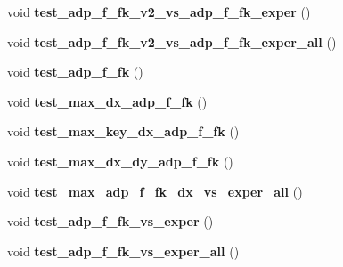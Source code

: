 \begin{DoxyCompactItemize}
\item 
\hypertarget{adp-tea-f-fk-tests_8cc_aab6bdf2062240f839eb3c81052d25497}{void {\bfseries test\-\_\-adp\-\_\-f\-\_\-fk\-\_\-v2\-\_\-vs\-\_\-adp\-\_\-f\-\_\-fk\-\_\-exper} ()}\label{adp-tea-f-fk-tests_8cc_aab6bdf2062240f839eb3c81052d25497}

\item 
\hypertarget{adp-tea-f-fk-tests_8cc_ad63023c04e2254011f35d82e3811b4bd}{void {\bfseries test\-\_\-adp\-\_\-f\-\_\-fk\-\_\-v2\-\_\-vs\-\_\-adp\-\_\-f\-\_\-fk\-\_\-exper\-\_\-all} ()}\label{adp-tea-f-fk-tests_8cc_ad63023c04e2254011f35d82e3811b4bd}

\item 
\hypertarget{adp-tea-f-fk-tests_8cc_a0a56b744da10d4186367990528e8bd7b}{void {\bfseries test\-\_\-adp\-\_\-f\-\_\-fk} ()}\label{adp-tea-f-fk-tests_8cc_a0a56b744da10d4186367990528e8bd7b}

\item 
\hypertarget{adp-tea-f-fk-tests_8cc_a2ba5832e577e649b1dab821477a4bc1f}{void {\bfseries test\-\_\-max\-\_\-dx\-\_\-adp\-\_\-f\-\_\-fk} ()}\label{adp-tea-f-fk-tests_8cc_a2ba5832e577e649b1dab821477a4bc1f}

\item 
\hypertarget{adp-tea-f-fk-tests_8cc_ade4ecb88cf875d7d6968a3871a861edb}{void {\bfseries test\-\_\-max\-\_\-key\-\_\-dx\-\_\-adp\-\_\-f\-\_\-fk} ()}\label{adp-tea-f-fk-tests_8cc_ade4ecb88cf875d7d6968a3871a861edb}

\item 
\hypertarget{adp-tea-f-fk-tests_8cc_a28e34b0b7bc6165d18984ee7a00ca9b4}{void {\bfseries test\-\_\-max\-\_\-dx\-\_\-dy\-\_\-adp\-\_\-f\-\_\-fk} ()}\label{adp-tea-f-fk-tests_8cc_a28e34b0b7bc6165d18984ee7a00ca9b4}

\item 
\hypertarget{adp-tea-f-fk-tests_8cc_af5f9c8e5e6ec0908de64c233f720ea61}{void {\bfseries test\-\_\-max\-\_\-adp\-\_\-f\-\_\-fk\-\_\-dx\-\_\-vs\-\_\-exper\-\_\-all} ()}\label{adp-tea-f-fk-tests_8cc_af5f9c8e5e6ec0908de64c233f720ea61}

\item 
\hypertarget{adp-tea-f-fk-tests_8cc_a94aa17e401cb93522e5c908e1d9d81d1}{void {\bfseries test\-\_\-adp\-\_\-f\-\_\-fk\-\_\-vs\-\_\-exper} ()}\label{adp-tea-f-fk-tests_8cc_a94aa17e401cb93522e5c908e1d9d81d1}

\item 
\hypertarget{adp-tea-f-fk-tests_8cc_a732c4d4b867173a1f94165517a1c0d29}{void {\bfseries test\-\_\-adp\-\_\-f\-\_\-fk\-\_\-vs\-\_\-exper\-\_\-all} ()}\label{adp-tea-f-fk-tests_8cc_a732c4d4b867173a1f94165517a1c0d29}


\end{DoxyCompactItemize}
